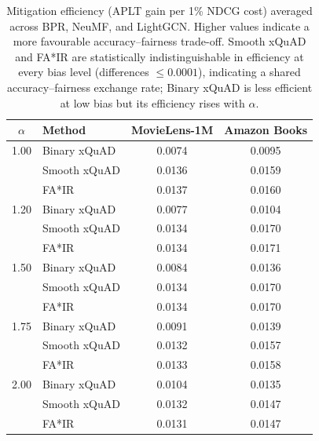 \begin{table}[htbp]
\centering
\caption{Mitigation efficiency (APLT gain per 1\% NDCG cost) averaged across BPR, NeuMF, and LightGCN. Higher values indicate a more favourable accuracy--fairness trade-off. Smooth xQuAD and FA*IR are statistically indistinguishable in efficiency at every bias level (differences $\le 0.0001$), indicating a shared accuracy--fairness exchange rate; Binary xQuAD is less efficient at low bias but its efficiency rises with $\alpha$.}
\label{tab:efficiency_avg}
\begin{tabular}{clcc}
\toprule
$\alpha$ & Method & MovieLens-1M & Amazon Books \\
\midrule
1.00 & Binary xQuAD & 0.0074 & 0.0095 \\
\rowcolor{gray!6}  & Smooth xQuAD & 0.0136 & 0.0159 \\
 & FA*IR & 0.0137 & 0.0160 \\
\midrule
1.20 & Binary xQuAD & 0.0077 & 0.0104 \\
\rowcolor{gray!6}  & Smooth xQuAD & 0.0134 & 0.0170 \\
 & FA*IR & 0.0134 & 0.0171 \\
\midrule
1.50 & Binary xQuAD & 0.0084 & 0.0136 \\
\rowcolor{gray!6}  & Smooth xQuAD & 0.0134 & 0.0170 \\
 & FA*IR & 0.0134 & 0.0170 \\
\midrule
1.75 & Binary xQuAD & 0.0091 & 0.0139 \\
\rowcolor{gray!6}  & Smooth xQuAD & 0.0132 & 0.0157 \\
 & FA*IR & 0.0133 & 0.0158 \\
\midrule
2.00 & Binary xQuAD & 0.0104 & 0.0135 \\
\rowcolor{gray!6}  & Smooth xQuAD & 0.0132 & 0.0147 \\
 & FA*IR & 0.0131 & 0.0147 \\
\bottomrule
\end{tabular}
\end{table}